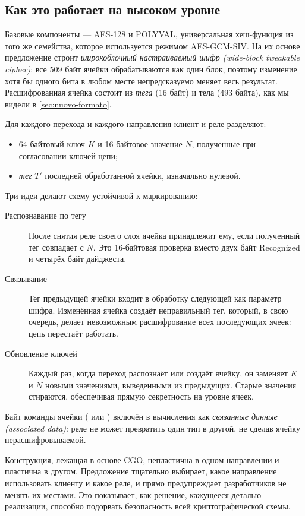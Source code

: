 \subsection{Как это работает на высоком уровне}

Базовые компоненты --- AES-128 и POLYVAL, универсальная хеш-функция из того же семейства, которое используется режимом AES-GCM-SIV. На их основе предложение строит \emph{широкоблочный настраиваемый шифр (wide-block tweakable cipher)}: все 509 байт ячейки обрабатываются как один блок, поэтому изменение хотя бы одного бита в любом месте непредсказуемо меняет весь результат. Расшифрованная ячейка состоит из \emph{тега} (16 байт) и тела (493 байта), как мы видели в \cref{sec:nuovo-formato}.

Для каждого перехода и каждого направления клиент и реле разделяют:
\begin{itemize}
  \item 64-байтовый ключ $K$ и 16-байтовое значение $N$, полученные при согласовании ключей цепи;
  \item \emph{тег} $T'$ последней обработанной ячейки, изначально нулевой.
\end{itemize}
Три идеи делают схему устойчивой к маркированию:
\begin{description}
  \item[Распознавание по тегу] После снятия реле своего слоя ячейка принадлежит ему, если полученный тег совпадает с $N$. Это 16-байтовая проверка вместо двух байт Recognized и четырёх байт дайджеста.
  \item[Связывание] Тег предыдущей ячейки входит в обработку следующей как параметр шифра. Изменённая ячейка создаёт неправильный тег, который, в свою очередь, делает невозможным расшифрование всех последующих ячеек: цепь перестаёт работать.
  \item[Обновление ключей] Каждый раз, когда переход распознаёт или создаёт ячейку, он заменяет $K$ и $N$ новыми значениями, выведенными из предыдущих. Старые значения стираются, обеспечивая прямую секретность на уровне ячеек.
\end{description}
Байт команды ячейки ( или ) включён в вычисления как \emph{связанные данные (associated data)}: реле не может превратить один тип в другой, не сделав ячейку нерасшифровываемой.

\begin{attenzione}
Конструкция, лежащая в основе CGO, непластична в одном направлении и пластична в другом. Предложение тщательно выбирает, какое направление использовать клиенту и какое реле, и прямо предупреждает разработчиков не менять их местами. Это показывает, как решение, кажущееся деталью реализации, способно подорвать безопасность всей криптографической схемы.
\end{attenzione}


